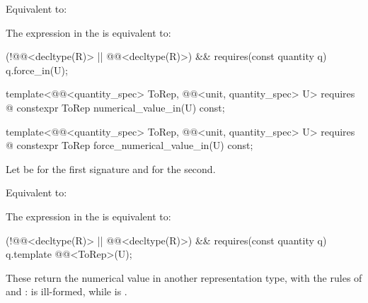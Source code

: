 \begin{itemdescr}
\pnum
\effects
Equivalent to:

\pnum
\remarks
The expression in the  is equivalent to:
\begin{codeblock}
(!@@<decltype(R)> || @@<decltype(R)>) &&
  requires(const quantity q) { q.force_in(U{}); }
\end{codeblock}
\end{itemdescr}

\begin{itemdecl}
template<@@<quantity_spec> ToRep, @@<unit, quantity_spec> U>
  requires @\seebelownc@
constexpr ToRep numerical_value_in(U) const;

template<@@<quantity_spec> ToRep, @@<unit, quantity_spec> U>
  requires @\seebelownc@
constexpr ToRep force_numerical_value_in(U) const;
\end{itemdecl}

\begin{itemdescr}
\pnum
Let  be  for the first signature and  for the second.

\pnum
\effects
Equivalent to:

\pnum
\remarks
The expression in the  is equivalent to:
\begin{codeblock}
(!@@<decltype(R)> || @@<decltype(R)>) &&
  requires(const quantity q) { q.template @@<ToRep>(U{}); }
\end{codeblock}

\pnum
\begin{note}
These return the numerical value in another representation type,
with the rules of  and :
 is ill-formed,
while  is .
\end{note}
\end{itemdescr}

